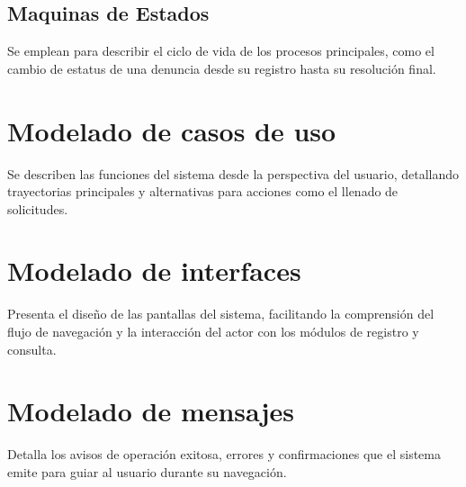         \subsection{Maquinas de Estados}
        \label{sec:ModMaquinas}
        Se emplean para describir el ciclo de vida de los procesos principales, como el cambio de estatus de una denuncia desde su registro hasta su resolución final.
    
    \clearpage
    \section{Modelado de casos de uso}
    Se describen las funciones del sistema desde la perspectiva del usuario, detallando trayectorias principales y alternativas para acciones como el llenado de solicitudes.

    \section{Modelado de interfaces}
    Presenta el diseño de las pantallas del sistema, facilitando la comprensión del flujo de navegación y la interacción del actor con los módulos de registro y consulta.

    \section{Modelado de mensajes}
    Detalla los avisos de operación exitosa, errores y confirmaciones que el sistema emite para guiar al usuario durante su navegación.